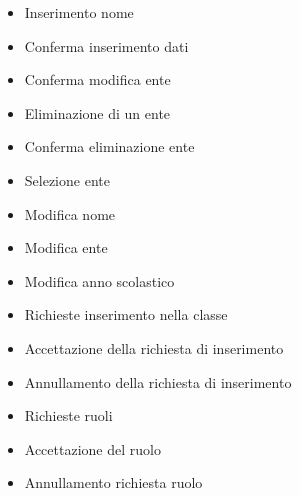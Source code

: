 \begin{itemize}
	\item {} Inserimento nome 
	\item {} Conferma inserimento dati 
	\item {} Conferma modifica ente 
	\item {} Eliminazione di un ente
	\item {} Conferma eliminazione ente 
	\item {} Selezione ente
	\item {} Modifica nome
	\item {} Modifica ente 
	\item {} Modifica anno scolastico
	\item {} Richieste inserimento nella classe
	\item {} Accettazione della richiesta di inserimento
	\item {} Annullamento della richiesta di inserimento
	\item {} Richieste ruoli
	\item {} Accettazione del ruolo
	\item {} Annullamento richiesta ruolo
\end{itemize}

